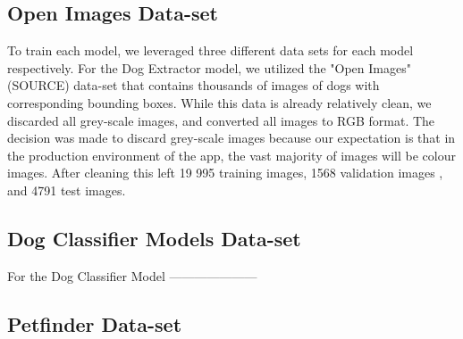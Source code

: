 \documentclass{article}
\begin{document}
\subsection{Open Images Data-set}

To train each model, we leveraged three different data sets for each model respectively.  For the Dog Extractor model, we utilized the "Open Images" (SOURCE) data-set that contains thousands of images of dogs with corresponding bounding boxes.  While this data is already relatively clean, we discarded all grey-scale images, and converted all images to RGB format.  The decision was made to discard grey-scale images because our expectation is that in the production environment of the app, the vast majority of images will be colour images.  After cleaning this left 19 995 training images, 1568 validation images , and 4791 test images.

\subsection{Dog Classifier Models Data-set}

For the Dog Classifier Model ---------------------

\subsection{Petfinder Data-set}
\end{document}
